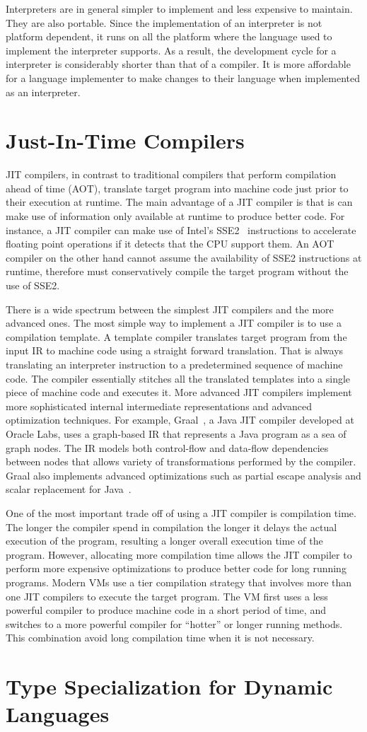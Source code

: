 Interpreters are in general simpler to implement and less expensive to maintain.
They are also portable.
Since the implementation of an interpreter is not platform dependent, it runs on all the platform where the language used to implement the interpreter supports.
As a result, the development cycle for a interpreter is considerably shorter than that of a compiler.
It is more affordable for a language implementer to make changes to their language when implemented as an interpreter.

\section{Just-In-Time Compilers}

JIT compilers, in contrast to traditional compilers that perform compilation ahead of time (AOT), translate target program into machine code just prior to their execution at runtime.
The main advantage of a JIT compiler is that is can make use of information only available at runtime to produce better code.
For instance, a JIT compiler can make use of Intel's SSE2~\cite{klimovitski2001using} instructions to accelerate floating point operations if it detects that the CPU support them.
An AOT compiler on the other hand cannot assume the availability of SSE2 instructions at runtime, therefore must conservatively compile the target program without the use of SSE2.

There is a wide spectrum between the simplest JIT compilers and the more advanced ones.
The most simple way to implement a JIT compiler is to use a compilation template.
A template compiler translates target program from the input IR to machine code using a straight forward translation.
That is always translating an interpreter instruction to a predetermined sequence of machine code.
The compiler essentially stitches all the translated templates into a single piece of machine code and executes it.
More advanced JIT compilers implement more sophisticated internal intermediate representations and advanced optimization techniques.
For example, Graal~\cite{duboscq2013graal}, a Java JIT compiler developed at Oracle Labs, uses a graph-based IR that represents a Java program as a sea of graph nodes.
The IR models both control-flow and data-flow dependencies between nodes that allows variety of transformations performed by the compiler.
Graal also implements advanced optimizations such as partial escape analysis and scalar replacement for Java~\cite{stadler2014partial}.

One of the most important trade off of using a JIT compiler is compilation time.
The longer the compiler spend in compilation the longer it delays the actual execution of the program, resulting a longer overall execution time of the program.
However, allocating more compilation time allows the JIT compiler to perform more expensive optimizations to produce better code for long running programs.
Modern VMs use a tier compilation strategy that involves more than one JIT compilers to execute the target program.
The VM first uses a less powerful compiler to produce machine code in a short period of time, and switches to a more powerful compiler for ``hotter'' or longer running methods.
This combination avoid long compilation time when it is not necessary.

\section{Type Specialization for Dynamic Languages}
